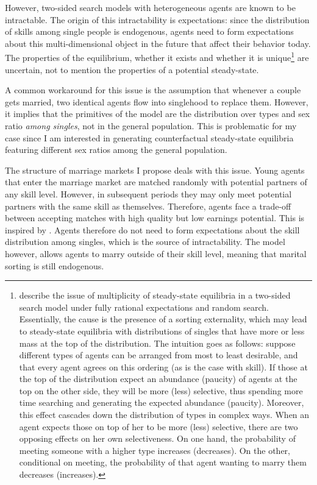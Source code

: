 \documentclass[12pt]{article}
\begin{document}
However, two-sided search models with heterogeneous agents are known to be intractable. The origin of this intractability is expectations: since the distribution of skills among single people is endogenous, agents need to form expectations about this multi-dimensional object in the future that affect their behavior today. The properties of the equilibrium, whether it exists and whether it is unique\footnote{\cite{burdettcoles97} describe the issue of multiplicity of steady-state equilibria in a two-sided search model under fully rational expectations and random search. Essentially, the cause is the presence of a sorting externality, which may lead to steady-state equilibria with distributions of singles that have more or less mass at the top of the distribution. The intuition goes as follows: suppose different types of agents can be arranged from most to least desirable, and that every agent agrees on this ordering (as is the case with skill). If those at the top of the distribution expect an abundance (paucity) of agents at the top on the other side, they will be more (less) selective, thus spending more time searching and generating the expected abundance (paucity). Moreover, this effect cascades down the distribution of types in complex ways. When an agent expects those on top of her to be more (less) selective, there are two opposing effects on her own selectiveness. On one hand, the probability of meeting someone with a higher type increases (decreases). On the other, conditional on meeting, the probability of that agent wanting to marry them decreases (increases).} are uncertain, not to mention the properties of a potential steady-state.

A common workaround for this issue is the assumption that whenever a couple gets married, two identical agents flow into singlehood to replace them. However, it implies that the primitives of the model are the distribution over types and sex ratio \textit{among singles}, not in the general population. This is problematic for my case since I am interested in generating counterfactual steady-state equilibria featuring different sex ratios among the general population. 

The structure of marriage markets I propose deals with this issue. Young agents that enter the marriage market are matched randomly with potential partners of any skill level. However, in subsequent periods they may only meet potential partners with the same skill as themselves. Therefore, agents face a trade-off between accepting matches with high quality but low earnings potential. This is inspired by \citet{fernandezetal05}. Agents therefore do not need to form expectations about the skill distribution among singles, which is the source of intractability. The model however, allows agents to marry outside of their skill level, meaning that marital sorting is still endogenous. 
\end{document}
